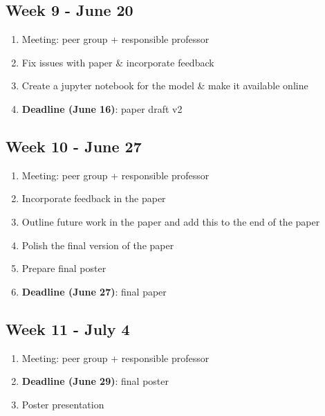 \documentclass[english]{article}
\begin{document}
\subsection*{Week 9 - June 20}
\begin{enumerate}
\item Meeting: peer group + responsible professor
\item Fix issues with paper \& incorporate feedback
\item Create a jupyter notebook for the model \& make it available online
\item \textbf{Deadline (June 16)}: paper draft v2
\end{enumerate}

\subsection*{Week 10 - June 27}
\begin{enumerate}
\item Meeting: peer group + responsible professor
\item Incorporate feedback in the paper
\item Outline future work in the paper and add this to the end of the paper
\item Polish the final version of the paper
\item Prepare final poster
\item \textbf{Deadline (June 27)}: final paper
\end{enumerate}

\subsection*{Week 11 - July 4}
\begin{enumerate}
\item Meeting: peer group + responsible professor
\item \textbf{Deadline (June 29)}: final poster
\item Poster presentation
\end{enumerate}



\pagebreak

\end{document}
